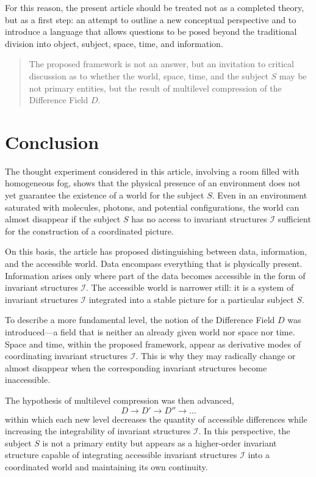 \documentclass[aps,prd,onecolumn,nofootinbib,superscriptaddress]{revtex4-2}
\begin{document}
For this reason, the present article should be treated not as a completed theory, but as a first step: an attempt to outline a new conceptual perspective and to introduce a language that allows questions to be posed beyond the traditional division into object, subject, space, time, and information.

\begin{quote}
The proposed framework is not an answer, but an invitation to critical discussion as to whether the world, space, time, and the subject \(S\) may be not primary entities, but the result of multilevel compression of the Difference Field \(D\).
\end{quote}

\section{Conclusion}

The thought experiment considered in this article, involving a room filled with homogeneous fog, shows that the physical presence of an environment does not yet guarantee the existence of a world for the subject \(S\). Even in an environment saturated with molecules, photons, and potential configurations, the world can almost disappear if the subject \(S\) has no access to invariant structures \(\mathcal{I}\) sufficient for the construction of a coordinated picture.

On this basis, the article has proposed distinguishing between data, information, and the accessible world. Data encompass everything that is physically present. Information arises only where part of the data becomes accessible in the form of invariant structures \(\mathcal{I}\). The accessible world is narrower still: it is a system of invariant structures \(\mathcal{I}\) integrated into a stable picture for a particular subject \(S\).

To describe a more fundamental level, the notion of the Difference Field \(D\) was introduced—a field that is neither an already given world nor space nor time. Space and time, within the proposed framework, appear as derivative modes of coordinating invariant structures \(\mathcal{I}\). This is why they may radically change or almost disappear when the corresponding invariant structures become inaccessible.

The hypothesis of multilevel compression was then advanced,
\[
D \to D' \to D'' \to \dots
\]
within which each new level decreases the quantity of accessible differences while increasing the integrability of invariant structures \(\mathcal{I}\). In this perspective, the subject \(S\) is not a primary entity but appears as a higher-order invariant structure capable of integrating accessible invariant structures \(\mathcal{I}\) into a coordinated world and maintaining its own continuity.
\end{document}
